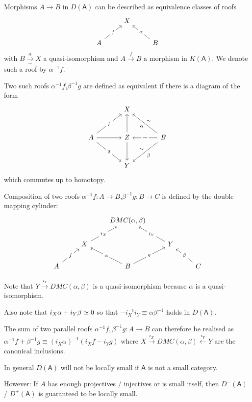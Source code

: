 \documentclass[fontsize=11pt,fleqn,a4paper]{scrartcl}
\begin{document}
\begin{theorem}
Morphisms $A\to B$ in $D(\mathsf{A})$ can be described as equivalence classes of roofs
\[\begin{tikzcd}
&X&\\
A \ar[ru,"f" description] && B \ar[lu,"\alpha" description]
\end{tikzcd}\]
with $B\xrightarrow[\sim]{\alpha} X$ a quasi-isomorphism and $A\xrightarrow{f} B$ a morphism in $K(\mathsf{A})$. We denote such a roof by $\alpha^{-1} f$.

Two such roofs $\alpha^{-1} f$,$\beta^{-1} g$ are defined as equivalent if there is a diagram of the form
\[\begin{tikzcd}[sep=large]
&X&\\
A \ar[ru,"f" description] \ar[rd,"g" description] \ar[r] & Z \ar[u] \ar[d] & B \ar[lu,"\alpha","\sim"'] \ar[ld,"\beta","\sim"'] \ar[l,"\sim" description] \\
&Y&
\end{tikzcd}\]
which commutes up to homotopy.

Composition of two roofs $\alpha^{-1}f: A\to B$,$\beta^{-1}g: B\to C$ is defined by the double mapping cylinder:
\[\begin{tikzcd}
&&DMC(\alpha,\beta)&&\\
& X \ar[ru,"i_X" description] && Y \ar[lu,"i_Y" description] &\\
A \ar[ru,"f" description] && B \ar[lu,"\alpha" description] \ar[ru,"g" description] && C  \ar[lu,"\beta" description]
\end{tikzcd}\]
\end{theorem}

\begin{remark}
Note that $Y \xrightarrow{i_Y} DMC(\alpha,\beta)$ is a quasi-isomorphism because $\alpha$ is a quasi-isomorphism.

Also note that $i_X \alpha + i_Y \beta \overset{}{\simeq} 0$ so that $-i_X^{-1} i_Y \equiv \alpha\beta^{-1}$ holds in $D(\mathsf{A})$.

The sum of two parallel roofs $\alpha^{-1}f,\beta^{-1}g: A\to B$ can therefore be realised as $\alpha^{-1}f+\beta^{-1}g \equiv (i_X \alpha)^{-1}(i_X f-i_Y g)$ where $X\xrightarrow{i_X} DMC(\alpha,\beta) \xleftarrow{i_Y} Y$ are the canonical inclusions.

\end{remark}

\begin{remark}
In general $D(\mathsf{A})$ will not be locally small if $\mathsf{A}$ is not a small category.

However: If $A$ has enough projectives / injectives or is small itself, then  $D^-(\mathsf{A})$ / $D^+(\mathsf{A})$ is guaranteed to be locally small.
\end{remark}
\end{document}
